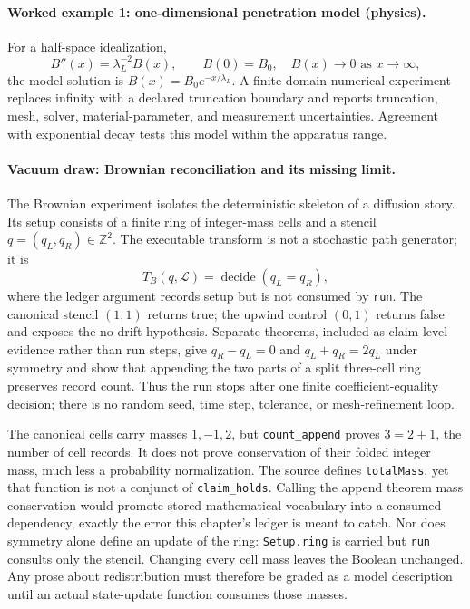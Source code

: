\paragraph{Worked example 1: one-dimensional penetration model (physics).}
For a half-space idealization,
\[
                         B''(x)=\lambda_L^{-2}B(x),\qquad
                         B(0)=B_0,\quad B(x)\to0\text{ as }x\to\infty,
\]
the model solution is \(B(x)=B_0e^{-x/\lambda_L}\).  A finite-domain numerical experiment replaces infinity with a
declared truncation boundary and reports truncation, mesh, solver, material-parameter, and measurement uncertainties.
Agreement with exponential decay tests this model within the apparatus range.

\paragraph{Vacuum draw: Brownian reconciliation and its missing limit.}
The Brownian experiment isolates the deterministic skeleton of a diffusion story.  Its setup consists of a finite
ring of integer-mass cells and a stencil \(q=(q_L,q_R)\in\mathbb Z^2\).  The executable transform is not a stochastic
path generator; it is
\[
 T_B(q,\mathcal L)=\operatorname{decide}(q_L=q_R),
\]
where the ledger argument records setup but is not consumed by \texttt{run}.  The canonical stencil \((1,1)\)
returns true; the upwind control \((0,1)\) returns false and exposes the no-drift hypothesis.  Separate theorems,
included as claim-level evidence rather than run steps, give \(q_R-q_L=0\) and \(q_L+q_R=2q_L\) under symmetry and
show that appending the two parts of a split three-cell ring preserves record count.  Thus the run stops after one
finite coefficient-equality decision; there is no random seed, time step, tolerance, or mesh-refinement loop.

The canonical cells carry masses \(1,-1,2\), but \texttt{count\_append} proves
\(3=2+1\), the number of cell records.  It does not prove conservation of their folded integer mass, much less a
probability normalization.  The source defines \texttt{totalMass}, yet that function is not a conjunct of \texttt{claim\_holds}.
Calling the append theorem mass conservation would promote stored mathematical vocabulary into a consumed
dependency, exactly the error this chapter's ledger is meant to catch.
Nor does symmetry alone define an update of the ring: \texttt{Setup.ring} is carried but \texttt{run} consults only the stencil.
Changing every cell mass leaves the Boolean unchanged.  Any prose about redistribution must therefore be graded as a
model description until an actual state-update function consumes those masses.

